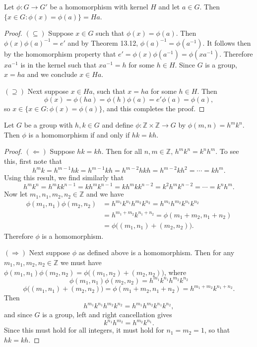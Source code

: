 \documentclass{article}
\newenvironment{problem1}[1]{\noindent {\bf Problem #1:}}
{\medskip}
\begin{document}
\begin{problem1}{52} Let $\phi: G\to G'$ be a homomorphism with kernel $H$ and let $a\in G$. Then $\{x\in G: \phi(x)=\phi(a)\}=Ha$.
\begin{proof}$(\subseteq)$ Suppose $x\in G$ such that $\phi(x)=\phi(a).$ Then $\phi(x)\phi(a)^{-1}=e'$ and by Theorem 13.12, $\phi(a)^{-1}=\phi(a^{-1}).$ It follows then by the homomorphism property that $e'=\phi(x)\phi(a^{-1})=\phi(xa^{-1}).$ Therefore $xa^{-1}$ is in the kernel such that $xa^{-1}=h$ for some $h\in H$. Since $G$ is a group, $x=ha$ and we conclude $x\in Ha$.

$(\supseteq)$ Next suppose $x\in Ha$, such that $x=ha$ for some $h\in H$. Then $$\phi(x)=\phi(ha)=\phi(h)\phi(a)=e'\phi(a)=\phi(a),$$ so $x\in \{x\in G : \phi(x)=\phi(a)\}$, and this completes the proof.
\end{proof}
\end{problem1}

\begin{problem1}{53} Let $G$ be a group with $h,k\in G$ and define $\phi:\mathbb{Z}\times\mathbb{Z}\to G$ by $\phi(m,n)=h^mk^n$. Then $\phi$ is a homomorphism if and only if $hk=kh$.
\begin{proof} $(\Leftarrow)$ Suppose $hk=kh$. Then for all $n,m\in\mathbb{Z}$, $h^mk^n=k^nh^m$. To see this, first note that $$h^mk=h^{m-1}hk=h^{m-1}kh=h^{m-2}hkh=h^{m-2}kh^2=\cdots=kh^m.$$ Using this result, we find similarly that $$h^mk^n=h^mkk^{n-1}=kh^mk^{n-1}=kh^mkk^{n-2}=k^2h^mk^{n-2}=\cdots=k^nh^m.$$ Now let $m_1,n_1,m_2,n_2\in\mathbb{Z}$ and we have \begin{align*}\phi(m_1,n_1)\phi(m_2,n_2)&=h^{m_1}k^{n_1}h^{m_2}k^{n_2}=h^{m_1}h^{m_2}k^{n_1}k^{n_2}\\ &=h^{m_1+m_2}k^{n_1+n_2}=\phi(m_1+m_2,n_1+n_2)\\ &=\phi\big((m_1,n_1)+(m_2,n_2)\big). \end{align*} Therefore $\phi$ is a homomorphism.

$(\Rightarrow)$ Next suppose $\phi$ as defined above is a homomorphism. Then for any $m_1,n_1,m_2,n_2\in\mathbb{Z}$ we must have $\phi(m_1,n_1)\phi(m_2,n_2)=\phi\big((m_1,n_2)+(m_2,n_2)\big)$, where $$\phi(m_1,n_1)\phi(m_2,n_2)=h^{m_1}k^{n_1}h^{m_2}k^{n_2}$$ $$\phi\big((m_1,n_1)+(m_2,n_2)\big)=\phi(m_1+m_2,n_1+n_2)=h^{m_1+m_2}k^{n_1+n_2}.$$ Then $$h^{m_1}k^{n_1}h^{m_2}k^{n_2}=h^{m_1}h^{m_2}k^{n_1}k^{n_2},$$ and since $G$ is a group, left and right cancellation gives $$k^{n_1}h^{m_2}=h^{m_2}k^{n_1}.$$ Since this must hold for all integers, it must hold for $n_1=m_2=1$, so that $hk=kh$.
\end{proof}
\end{problem1}
\end{document}
